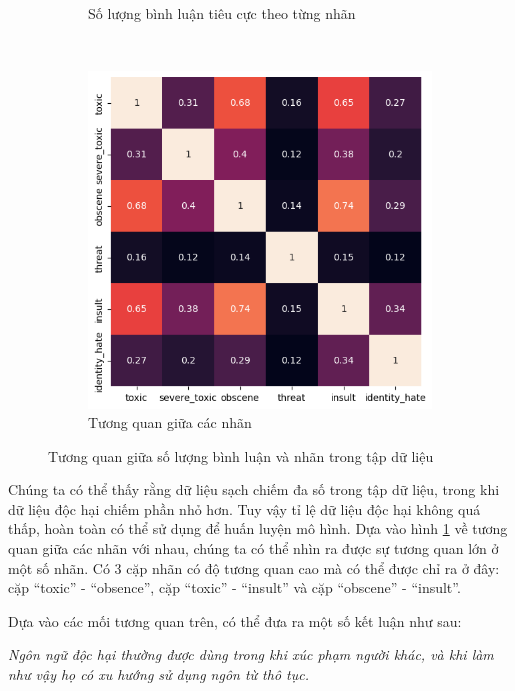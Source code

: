 \begin{figure}[htb!]
\begin{subfigure}[t]{0.7\textwidth}
        \caption{Số lượng bình luận tiêu cực theo từng nhãn}
    \end{subfigure}\\
    \begin{subfigure}{0.6\textwidth}
        \centering
        \includegraphics[width=\textwidth]{image/labels_corr.png}
        \caption{Tương quan giữa các nhãn}
    \end{subfigure}%
    \caption{Tương quan giữa số lượng bình luận và nhãn trong tập dữ liệu}
    \label{image:number_of_records_and_labels}
\end{figure}

Chúng ta có thể thấy rằng dữ liệu sạch chiếm đa số trong tập dữ liệu, trong khi dữ liệu độc hại chiếm phần nhỏ hơn. Tuy vậy tỉ lệ dữ liệu độc hại không quá thấp, hoàn toàn có thể sử dụng để huấn luyện mô hình. Dựa vào hình \ref{image:number_of_records_and_labels} về tương quan giữa các nhãn với nhau, chúng ta có thể nhìn ra được sự tương quan lớn ở một số nhãn. Có 3 cặp nhãn có độ tương quan cao mà có thể được chỉ ra ở đây: cặp ``toxic'' - ``obsence'', cặp ``toxic'' - ``insult'' và cặp ``obscene'' - ``insult''.

Dựa vào các mối tương quan trên, có thể đưa ra một số kết luận như sau:

\textit{Ngôn ngữ độc hại thường được dùng trong khi xúc phạm người khác, và khi làm như vậy họ có xu hướng sử dụng ngôn từ thô tục.}

